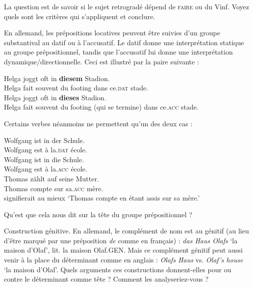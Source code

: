 {    La question est de savoir si le sujet retrogradé dépend de \textsc{faire} ou du Vinf. Voyez quels sont les critères qui s’appliquent et conclure.

     En allemand, les prépositions locatives peuvent être suivies d’un groupe substantival au datif ou à l’accusatif. Le datif donne une interprétation statique au groupe prépositionnel, tandis que l’accusatif lui donne une interprétation dynamique/directionnelle. Ceci est illustré par la paire suivante :

    \ea
    \ea
    \gll   Helga joggt oft in \textbf{diesem} Stadion.\\
    Helga fait souvent du footing dans ce.\textsc{dat} stade.\\
    \ex
    \gll   Helga joggt oft in \textbf{dieses} Stadion.\\
    Helga fait souvent du footing (qui se termine) dans ce.\textsc{acc} stade.\\
    \z
    \z

    Certains verbes néanmoins ne permettent qu’un des deux cas :

    \ea
    \ea
    \gll   Wolfgang ist in der Schule.\\
    Wolfgang est à la.\textsc{dat} école.\\

    \ex
    \gll   *Wolfgang ist in die Schule. \\
    Wolfgang est à la.\textsc{acc} école.\\

    \ex
    \gll Thomas zählt auf seine Mutter.\\
    Thomas compte sur sa.\textsc{acc} mère.\\

    \glt    signifierait au mieux ‘Thomas compte en étant assis sur sa mère.’
    \z
    \z

    Qu’est que cela nous dit sur la tête du groupe prépositionnel ?

     Construction génitive. En allemand, le complément de nom est au génitif (au lieu d’être marqué par une préposition \textit{de} comme en français) : \textit{das Haus Olafs} ‘la maison d’Olaf’, lit. la maison Olaf.GEN. Mais ce complément génitif peut aussi venir à la place du déterminant comme en anglais : \textit{Olafs Haus} vs. \textit{Olaf’s house} ‘la maison d’Olaf’. Quels arguments ces constructions donnent-elles pour ou contre le déterminant comme tête ? Comment les analyseriez-vous ?
}

